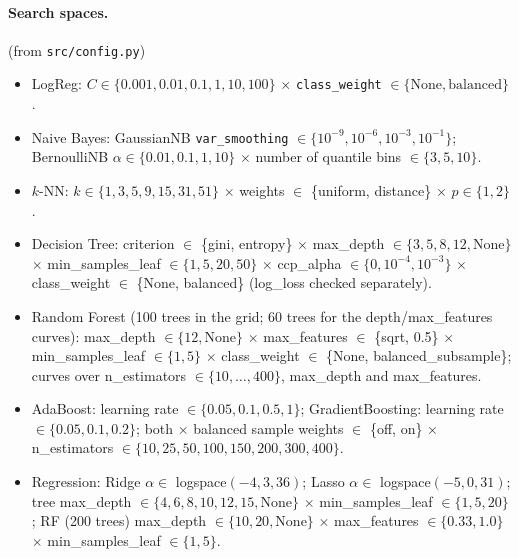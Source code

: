 \paragraph{Search spaces.} (from \texttt{src/config.py})
\begin{itemize}
  \item LogReg: $C \in \{0.001, 0.01, 0.1, 1, 10, 100\}$ $\times$ \texttt{class\_weight} $\in \{\text{None}, \text{balanced}\}$.
  \item Naive Bayes: GaussianNB \texttt{var\_smoothing} $\in \{10^{-9}, 10^{-6}, 10^{-3}, 10^{-1}\}$;
        BernoulliNB $\alpha \in \{0.01, 0.1, 1, 10\}$ $\times$ number of quantile bins $\in \{3, 5, 10\}$.
  \item $k$-NN: $k \in \{1, 3, 5, 9, 15, 31, 51\}$ $\times$ weights $\in$ \{uniform, distance\} $\times$ $p \in \{1, 2\}$.
  \item Decision Tree: criterion $\in$ \{gini, entropy\} $\times$ max\_depth $\in \{3, 5, 8, 12, \text{None}\}$ $\times$
        min\_samples\_leaf $\in \{1, 5, 20, 50\}$ $\times$ ccp\_alpha $\in \{0, 10^{-4}, 10^{-3}\}$ $\times$
        class\_weight $\in$ \{None, balanced\} (log\_loss checked separately).
  \item Random Forest (100 trees in the grid; 60 trees for the depth/max\_features curves): max\_depth $\in \{12, \text{None}\}$ $\times$ max\_features $\in$
        \{sqrt, 0.5\} $\times$ min\_samples\_leaf $\in \{1, 5\}$ $\times$ class\_weight $\in$ \{None,
        balanced\_subsample\}; curves over n\_estimators $\in \{10, \dots, 400\}$, max\_depth and max\_features.
  \item AdaBoost: learning rate $\in \{0.05, 0.1, 0.5, 1\}$; GradientBoosting: learning rate $\in \{0.05, 0.1, 0.2\}$;
        both $\times$ balanced sample weights $\in$ \{off, on\} $\times$ n\_estimators $\in \{10, 25, 50, 100, 150, 200, 300, 400\}$.
  \item Regression: Ridge $\alpha \in$ logspace$(-4, 3, 36)$; Lasso $\alpha \in$ logspace$(-5, 0, 31)$; tree max\_depth
        $\in \{4, 6, 8, 10, 12, 15, \text{None}\}$ $\times$ min\_samples\_leaf $\in \{1, 5, 20\}$; RF (200 trees)
        max\_depth $\in \{10, 20, \text{None}\}$ $\times$ max\_features $\in \{0.33, 1.0\}$ $\times$ min\_samples\_leaf $\in \{1, 5\}$.
\end{itemize}

